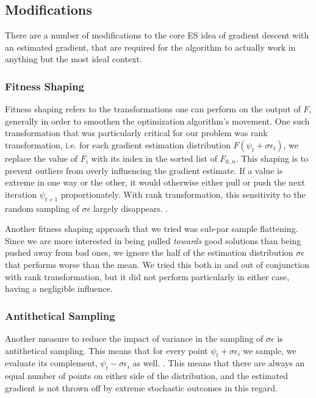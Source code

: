 \subsection{Modifications}
There are a number of modifications to the core ES idea of gradient descent with an estimated gradient, that are required for the algorithm to actually work in anything but the most ideal context. 

\subsubsection{Fitness Shaping}
Fitness shaping refers to the transformations one can perform on the output of $F$, generally in order to smoothen the optimization algorithm's movement. One such transformation that was particularly critical for our problem was rank transformation, i.e. for each gradient estimation distribution $F(\psi_t + \sigma\epsilon_i)$, we replace the value of $F_i$ with its index in the sorted list of $F_{0..n}$. This shaping is to prevent outliers from overly influencing the gradient estimate. If a value is extreme in one way or the other, it would otherwise either pull or push the next iteration $\psi_{t+1}$ proportionately. With rank transformation, this sensitivity to the random sampling of $\sigma\epsilon$ largely disappears. \cite{Wierstra2011}. 

Another fitness shaping approach that we tried was sub-par sample flattening. Since we are more interested in being pulled \textit{towards} good solutions than being pushed away from bad ones, we ignore the half of the estimation distribution $\sigma\epsilon$ that performs worse than the mean. We tried this both in and out of conjunction with rank transformation, but it did not perform particularly in either case, having a negligible influence.

\subsubsection{Antithetical Sampling}
Another measure to reduce the impact of variance in the sampling of $\sigma\epsilon$ is antithetical sampling. This means that for every point $\psi_t + \sigma\epsilon_i$ we sample, we evaluate its complement, $\psi_t - \sigma\epsilon_i$ as well. \cite{Salimans2017}. This means that there are always an equal number of points on either side of the distribution, and the estimated gradient is not thrown off by extreme stochastic outcomes in this regard.


